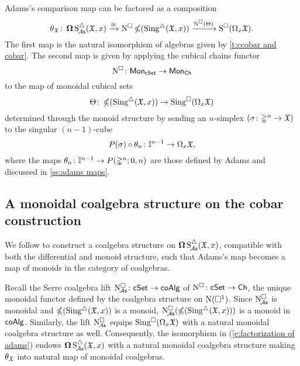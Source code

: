 Adams's comparison map can be factored as a composition
\begin{equation}\label{e:factorization of adams}
	\theta_\fX \colon \cobar \sSchainsA(\fX,x) \xrightarrow{\cong}
	\cchains \ccobar(\sSing(\fX,x)) \xrightarrow{\cchains(\Theta)}
	\cSchains(\loops_x \fX).
\end{equation}
The first map is the natural isomorphism of algebras given by \cref{t:ccobar and cobar}.
The second map is given by applying the cubical chains functor
\[
\cchains \colon \Mon_{\cSet} \to \Mon_{\Ch}
\]
to the map of monoidal cubical sets
\[
\Theta \colon \ccobar(\sSing(\fX,x)) \to \cSing(\loops_x \fX)
\]
determined through the monoid structure by sending an $n$-simplex $(\sigma \colon \gsimplex^n \to \fX)$ to the singular $(n-1)$-cube
\[
P(\sigma) \circ \theta_n \colon \gcube^{n-1} \to \loops_x \fX,
\]
where the maps $\theta_n \colon \gcube^{n-1} \to P(\gsimplex^n;0,n)$ are those defined by Adams and discussed in \cref{ss:adams maps}.

\subsection{A monoidal coalgebra structure on the cobar construction}

We follow \cite{baues1998hopf} to construct a coalgebra structure on $\cobar \sSchainsA(\fX,x)$, compatible with both the differential and monoid structure, such that Adams's map becomes a map of monoids in the category of coalgebras.

Recall the Serre coalgebra lift $\cchainsA \colon \cSet \to \coAlg$ of $\cchains \colon \cSet \to \Ch$, the unique monoidal functor defined by the coalgebra structure on $\chains(\cube^1)$.
Since $\cchainsA$ is monoidal and $\ccobar(\sSing(\fX,x))$ is a monoid, $\cchainsA(\ccobar(\sSing(\fX,x)))$ is a monoid in $\coAlg$.
Similarly, the lift $\cchainsA$ equips $\cSing(\loops_x \fX)$ with a natural monoidal coalgebra structure as well.
Consequently, the isomorphism in (\ref{e:factorization of adams}) endows $\cobar \sSchainsA(\fX,x)$ with a natural monoidal coalgebra structure making $\theta_\fX$ into natural map of monoidal coalgebras.